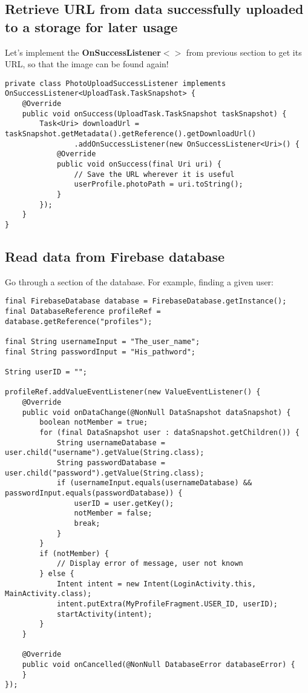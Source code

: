 \documentclass[11pt]{article}
\begin{document}
\subsection{Retrieve URL from data successfully uploaded to a storage for later usage}
Let's implement the \textbf{OnSuccessListener$<>$} from previous section to get its URL, so that the image can be found again!
\lstset{language = Java}
\begin{lstlisting}
private class PhotoUploadSuccessListener implements OnSuccessListener<UploadTask.TaskSnapshot> {
	@Override
	public void onSuccess(UploadTask.TaskSnapshot taskSnapshot) {
		Task<Uri> downloadUrl = taskSnapshot.getMetadata().getReference().getDownloadUrl()
				.addOnSuccessListener(new OnSuccessListener<Uri>() {
			@Override
			public void onSuccess(final Uri uri) {
				// Save the URL wherever it is useful
				userProfile.photoPath = uri.toString();
			}
		});
	}
}
\end{lstlisting}

\subsection{Read data from Firebase database}
\label{ValueEventListenerExample}
Go through a section of the database. For example, finding a given user:
\lstset{language = Java}
\begin{lstlisting}
final FirebaseDatabase database = FirebaseDatabase.getInstance();
final DatabaseReference profileRef = database.getReference("profiles");

final String usernameInput = "The_user_name";
final String passwordInput = "His_pathword";

String userID = "";

profileRef.addValueEventListener(new ValueEventListener() {
	@Override
	public void onDataChange(@NonNull DataSnapshot dataSnapshot) {
		boolean notMember = true;
		for (final DataSnapshot user : dataSnapshot.getChildren()) {
			String usernameDatabase = user.child("username").getValue(String.class);
			String passwordDatabase = user.child("password").getValue(String.class);
			if (usernameInput.equals(usernameDatabase) && passwordInput.equals(passwordDatabase)) {
				userID = user.getKey();
				notMember = false;
				break;
			}
		}
		if (notMember) {
			// Display error of message, user not known
		} else {
			Intent intent = new Intent(LoginActivity.this, MainActivity.class);
			intent.putExtra(MyProfileFragment.USER_ID, userID);
			startActivity(intent);
		}
	}
	
	@Override
	public void onCancelled(@NonNull DatabaseError databaseError) {
	}
});
\end{lstlisting}
\end{document}
